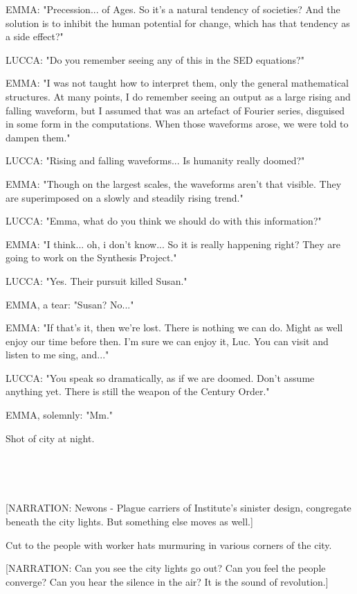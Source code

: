 \documentclass[11pt]{article}
\begin{document}
EMMA: "Precession... of Ages.
So it's a natural tendency of societies?
And the solution is to inhibit the human potential for change, which has that tendency as a side effect?"

LUCCA: "Do you remember seeing any of this in the SED equations?"

EMMA: "I was not taught how to interpret them, only the general mathematical structures.
At many points, I do remember seeing an output as a large rising and falling waveform, but I assumed that was an artefact of Fourier series, disguised in some form in the computations.
When those waveforms arose, we were told to dampen them."

LUCCA: "Rising and falling waveforms...
Is humanity really doomed?"

EMMA: "Though on the largest scales, the waveforms aren't that visible.
They are superimposed on a slowly and steadily rising trend."

LUCCA: "Emma, what do you think we should do with this information?"

EMMA: "I think... oh, i don't know...
So it is really happening right?
They are going to work on the Synthesis Project."

LUCCA: "Yes. Their pursuit killed Susan."

EMMA, a tear: "Susan? No..."

EMMA: "If that's it, then we're lost.
There is nothing we can do.
Might as well enjoy our time before then.
I'm sure we can enjoy it, Luc.
You can visit and listen to me sing, and..."

LUCCA: "You speak so dramatically, as if we are doomed.
Don't assume anything yet. 
There is still the weapon of the Century Order."

EMMA, solemnly: "Mm."

Shot of city at night.

\ 

\ 

[NARRATION: Newons - Plague carriers of Institute's sinister design, congregate beneath the city lights. 
But something else moves as well.]

Cut to the people with worker hats murmuring in various corners of the city.

[NARRATION: Can you see the city lights go out?
Can you feel the people converge?
Can you hear the silence in the air?
It is the sound of revolution.]
\end{document}

